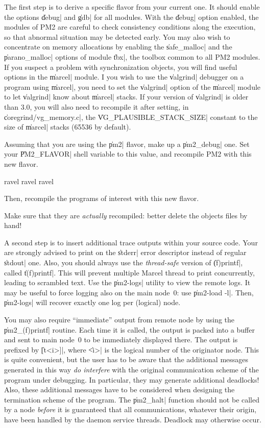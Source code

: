 The first step is to derive a specific flavor from your current one.
It should enable the options \|debug| and \|gdb| for all modules. With
the \|debug| option enabled, the modules of PM2 are careful to check
consistency conditions along the execution, so that abnormal situation
may be detected early. You may also wish to concentrate on memory
allocations by enabling the \|safe_malloc| and the \|parano_malloc|
options of module \|tbx|, the toolbox common to all PM2 modules. If
you suspect a problem with synchronization objects, you will find
useful options in the \|marcel| module.
I you wish to use the \|valgrind| debugger on a program using
\|marcel|, you need to set the \|valgrind| option of the \|marcel|
module to let \|valgrind| know about \|marcel| stacks. If your version
of \|valgrind| is older than 3.0, you will also need to recompile it
after setting, in \|coregrind/vg_memory.c|, the
\|VG_PLAUSIBLE_STACK_SIZE| constant to the size of \|marcel| stacks
(65536 by default).

Assuming that you are using the \|pm2| flavor, make up a
\|pm2_debug| one. Set your \|PM2_FLAVOR| shell variable to this value,
and recompile PM2 with this new flavor. 
\begin{shell}
ravel%
ravel%
ravel%
\end{shell}
Then, recompile the programs of interest with this new flavor. 

\begin{warning}
  Make sure that they are \emph{actually} recompiled: better delete
  the objects files by hand!
\end{warning}


A second step is to insert additional trace outputs within your source
code. Your are strongly advised to print on the \|stderr| error
descriptor instead of regular \|stdout| one. Also, you should always
use the \emph{thread-safe} version of \|(f)printf|, called \|t(f)printf|.
This will prevent multiple Marcel thread to print concurrently,
leading to scrambled text. Use the \|pm2-logs| utility to view the
remote logs. It may be useful to force logging also on the main
node~0: use \|pm2-load -l|. Then, \|pm2-logs| will recover exactly one
log per (logical) node.

You may also require ``immediate'' output from remote node by using
the \|pm2_(f)printf| routine. Each time it is called, the output is
packed into a buffer and sent to main node~0 to be immediately
displayed there. The output is prefixed by \|[t<i>]|, where \|<i>| is
the logical number of the originator node.  This is quite convenient, but
the user has to be aware that the additional messages generated in
this way \emph{do interfere} with the original communication scheme of
the program under debugging. In particular, they may generate
additional deadlocks! Also, these additional messages have to be
considered when designing the termination scheme of the program. The
\|pm2_halt| function should not be called by a node \emph{before} it
is guaranteed that all communications, whatever their origin, have
been handled by the daemon service threads. Deadlock may otherwise
occur.

